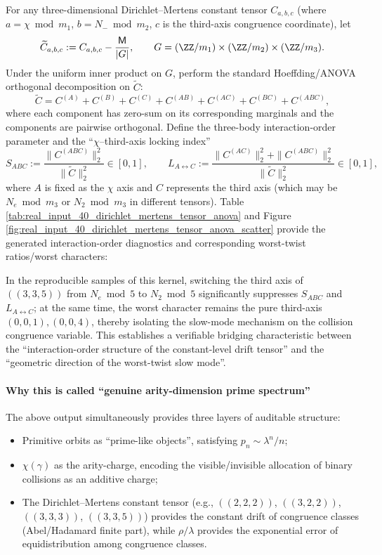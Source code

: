 \begin{remark}\label{rem:dirichlet-mertens-anova-fingerprint}
For any three-dimensional Dirichlet--Mertens constant tensor \(C_{a,b,c}\) (where \(a=\chi\bmod m_1\), \(b=N_-\bmod m_2\), \(c\) is the third-axis congruence coordinate), let
$$
\widetilde C_{a,b,c}:=C_{a,b,c}-\frac{\mathsf{M}}{|G|},
\qquad
G=(\ZZ/m_1)\times(\ZZ/m_2)\times(\ZZ/m_3).
$$
Under the uniform inner product on \(G\), perform the standard Hoeffding/ANOVA orthogonal decomposition on \(\widetilde C\):
$$
\widetilde C
=C^{(A)}+C^{(B)}+C^{(C)}+C^{(AB)}+C^{(AC)}+C^{(BC)}+C^{(ABC)},
$$
where each component has zero-sum on its corresponding marginals and the components are pairwise orthogonal.
Define the three-body interaction-order parameter and the ``\(\chi\)--third-axis locking index''
$$
S_{ABC}:=\frac{\|C^{(ABC)}\|_2^2}{\|\widetilde C\|_2^2}\in[0,1],
\qquad
L_{A\leftrightarrow C}:=\frac{\|C^{(AC)}\|_2^2+\|C^{(ABC)}\|_2^2}{\|\widetilde C\|_2^2}\in[0,1],
$$
where \(A\) is fixed as the \(\chi\) axis and \(C\) represents the third axis (which may be \(N_e\bmod m_3\) or \(N_2\bmod m_3\) in different tensors).
Table \ref{tab:real_input_40_dirichlet_mertens_tensor_anova} and Figure \ref{fig:real_input_40_dirichlet_mertens_tensor_anova_scatter} provide the generated interaction-order diagnostics and corresponding worst-twist ratios/worst characters:


\par
In the reproducible samples of this kernel, switching the third axis of \(((3,3,5))\) from \(N_e\bmod 5\) to \(N_2\bmod 5\) significantly suppresses \(S_{ABC}\) and \(L_{A\leftrightarrow C}\);
at the same time, the worst character remains the pure third-axis \((0,0,1),(0,0,4)\), thereby isolating the slow-mode mechanism on the collision congruence variable.
This establishes a verifiable bridging characteristic between the ``interaction-order structure of the constant-level drift tensor'' and the ``geometric direction of the worst-twist slow mode''.
\end{remark}

\paragraph{Why this is called ``genuine arity-dimension prime spectrum''}
The above output simultaneously provides three layers of auditable structure:
\begin{itemize}
  \item Primitive orbits as ``prime-like objects'', satisfying $p_n\sim \lambda^n/n$;
\item $\chi(\gamma)$ as the arity-charge, encoding the visible/invisible allocation of binary collisions as an additive charge;
  \item The Dirichlet--Mertens constant tensor (e.g., \(((2,2,2))\), \(((3,2,2))\), \(((3,3,3))\), \(((3,3,5))\)) provides the constant drift of congruence classes (Abel/Hadamard finite part), while $\rho/\lambda$ provides the exponential error of equidistribution among congruence classes.
\end{itemize}
